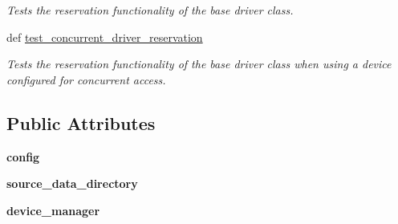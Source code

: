 \begin{DoxyCompactItemize}
\begin{DoxyCompactList}\small\item\em Tests the reservation functionality of the base driver class. \end{DoxyCompactList}\item 
\hypertarget{classhwm_1_1hardware_1_1devices_1_1drivers_1_1tests_1_1test__base__driver__class_1_1_test_base_driver_a71dc72417a57dd0e135a84d11f372e35}{def \hyperlink{classhwm_1_1hardware_1_1devices_1_1drivers_1_1tests_1_1test__base__driver__class_1_1_test_base_driver_a71dc72417a57dd0e135a84d11f372e35}{test\-\_\-concurrent\-\_\-driver\-\_\-reservation}}\label{classhwm_1_1hardware_1_1devices_1_1drivers_1_1tests_1_1test__base__driver__class_1_1_test_base_driver_a71dc72417a57dd0e135a84d11f372e35}

\begin{DoxyCompactList}\small\item\em Tests the reservation functionality of the base driver class when using a device configured for concurrent access. \end{DoxyCompactList}\end{DoxyCompactItemize}
\subsection*{Public Attributes}
\begin{DoxyCompactItemize}
\item 
\hypertarget{classhwm_1_1hardware_1_1devices_1_1drivers_1_1tests_1_1test__base__driver__class_1_1_test_base_driver_ad5f2924b18723d5a8695ba7364a11f16}{{\bfseries config}}\label{classhwm_1_1hardware_1_1devices_1_1drivers_1_1tests_1_1test__base__driver__class_1_1_test_base_driver_ad5f2924b18723d5a8695ba7364a11f16}

\item 
\hypertarget{classhwm_1_1hardware_1_1devices_1_1drivers_1_1tests_1_1test__base__driver__class_1_1_test_base_driver_acf0aa77ae8bd5657afd8624d8385da38}{{\bfseries source\-\_\-data\-\_\-directory}}\label{classhwm_1_1hardware_1_1devices_1_1drivers_1_1tests_1_1test__base__driver__class_1_1_test_base_driver_acf0aa77ae8bd5657afd8624d8385da38}

\item 
\hypertarget{classhwm_1_1hardware_1_1devices_1_1drivers_1_1tests_1_1test__base__driver__class_1_1_test_base_driver_a859fee3785ef3d39c0699b1a07e5e546}{{\bfseries device\-\_\-manager}}\label{classhwm_1_1hardware_1_1devices_1_1drivers_1_1tests_1_1test__base__driver__class_1_1_test_base_driver_a859fee3785ef3d39c0699b1a07e5e546}

\end{DoxyCompactItemize}
